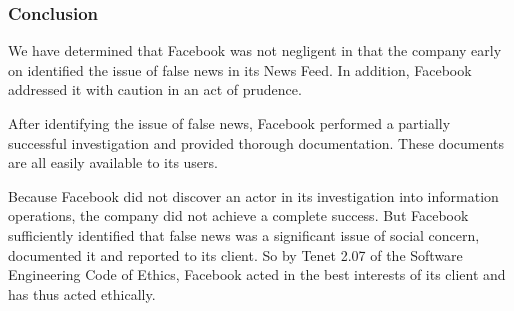 \subsubsection{Conclusion}

\par We have determined that Facebook was not negligent in that the company early on identified the issue of false news in its News Feed. In addition, Facebook addressed it with caution in an act of prudence.

\par After identifying the issue of false news, Facebook performed a partially successful investigation and provided thorough documentation. These documents are all easily available to its users.

\par Because Facebook did not discover an actor in its investigation into information operations, the company did not achieve a complete success. But Facebook sufficiently identified that false news was a significant issue of social concern, documented it and reported to its client. So by Tenet 2.07 of the Software Engineering Code of Ethics, Facebook acted in the best interests of its client and has thus acted ethically.